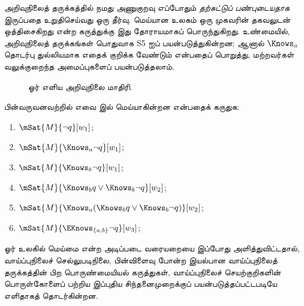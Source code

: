 \documentclass[../../../include/open-logic-section]{subfiles}
\begin{document}
அறிவுநிலைத் தருக்கத்தில் நமது அணுகுறவு எப்போதும் \emph{தற்சுட்டுப்
பண்புடையதாக} இருப்பதை உறுதிசெய்வது ஒரு தீர்வு. மெய்யான உலகம் ஒரு முகவரின்
தகவலுடன் ஒத்திசைகிறது என்ற கருத்துக்கு இது தோராயமாகப் பொருந்துகிறது.
உண்மையில், அறிவுநிலைத் தருக்கங்கள் பொதுவாக S5 ஐப் பயன்படுத்துகின்றன; ஆனால்
$\Knows_a$ தொடர்பு துல்லியமாக எதைக் குறிக்க வேண்டும் என்பதைப் பொறுத்து,
மற்றவர்கள் வலுக்குறைந்த அமைப்புகளைப் பயன்படுத்தலாம்.

\begin{figure}
  \begin{center}
  \end{center}
  \caption{ஓர் எளிய அறிவுநிலை மாதிரி.}
\end{figure}

\begin{prob}
  பின்வருவனவற்றில் எவை  இல் மெய்யாகின்றன
  என்பதைக் கருதுக:
  \begin{enumerate}
    \item $\mSat{M}{\lnot q}[w_1]$;
    \item $\mSat{M}{\Knows_a \lnot q}[w_1]$;
    \item $\mSat{M}{\Knows_b \lnot q}[w_1]$;
    \item $\mSat{M}{\Knows_b q \lor \Knows_b \lnot q}[w_2]$;
    \item $\mSat{M}{\Knows_a( \Knows_b q \lor \Knows_b \lnot q)}[w_2]$;
    \item $\mSat{M}{\EKnows_{\{a,b\}} \lnot q}[w_3]$;
    \end{enumerate}
\end{prob}

ஓர் உலகில் மெய்மை என்ற அடிப்படை வரையறையை இப்போது அளித்துவிட்டதால்,
வாய்ப்புநிலைச் செல்லுபடிநிலை, பின்விளைவு போன்ற இயல்பான வாய்ப்புநிலைத்
தருக்கத்தின் பிற பொருண்மையியல் கருத்துகள், வாய்ப்புநிலைச் செயற்குறிகளின்
பொருள்கோளைப் பற்றிய இப்புதிய சிந்தனைமுறைக்குப் பயன்படுத்தப்பட்டபடியே
எளிதாகத் தொடர்கின்றன.
\end{document}
